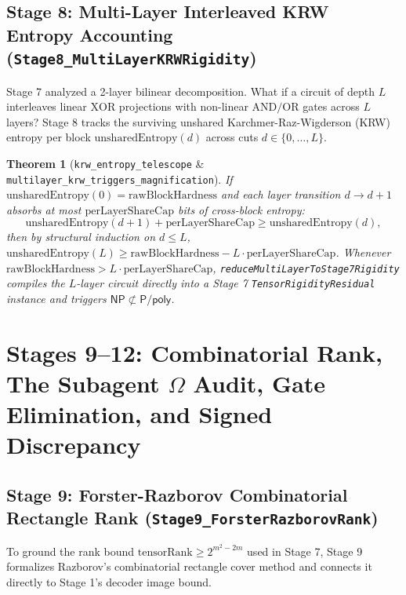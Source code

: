 \documentclass[11pt,a4paper]{article}
\theoremstyle{plain}
\newtheorem{theorem}{Theorem}[section]
\theoremstyle{definition}
\theoremstyle{remark}
\newcommand{\lean}[1]{\texttt{\textcolor{slate}{#1}}}
\newcommand{\NP}{\mathsf{NP}}
\newcommand{\Ppoly}{\mathsf{P/poly}}
\begin{document}
\subsection{Stage 8: Multi-Layer Interleaved KRW Entropy Accounting (\lean{Stage8\_MultiLayerKRWRigidity})}
Stage 7 analyzed a 2-layer bilinear decomposition. What if a circuit of depth $L$ interleaves linear $\text{XOR}$ projections with non-linear $\text{AND}/\text{OR}$ gates across $L$ layers? Stage 8 tracks the surviving unshared Karchmer-Raz-Wigderson (KRW) entropy per block $\mathrm{unsharedEntropy}(d)$ across cuts $d \in \{0, \dots, L\}$.

\begin{theorem}[\lean{krw\_entropy\_telescope} \& \lean{multilayer\_krw\_triggers\_magnification}]
If $\mathrm{unsharedEntropy}(0) = \mathrm{rawBlockHardness}$ and each layer transition $d \to d+1$ absorbs at most $\mathrm{perLayerShareCap}$ bits of cross-block entropy:
\begin{equation}
    \mathrm{unsharedEntropy}(d+1) + \mathrm{perLayerShareCap} \ge \mathrm{unsharedEntropy}(d),
\end{equation}
then by structural induction on $d \le L$, $\mathrm{unsharedEntropy}(L) \ge \mathrm{rawBlockHardness} - L \cdot \mathrm{perLayerShareCap}$. Whenever $\mathrm{rawBlockHardness} > L \cdot \mathrm{perLayerShareCap}$, \lean{reduceMultiLayerToStage7Rigidity} compiles the $L$-layer circuit directly into a Stage 7 \lean{TensorRigidityResidual} instance and triggers $\NP \not\subset \Ppoly$.
\end{theorem}

\section{Stages 9--12: Combinatorial Rank, The Subagent $\Omega$ Audit, Gate Elimination, and Signed Discrepancy}

\subsection{Stage 9: Forster-Razborov Combinatorial Rectangle Rank (\lean{Stage9\_ForsterRazborovRank})}
To ground the rank bound $\mathrm{tensorRank} \ge 2^{m^2 - 2m}$ used in Stage 7, Stage 9 formalizes Razborov's combinatorial rectangle cover method and connects it directly to Stage 1's decoder image bound.
\end{document}
